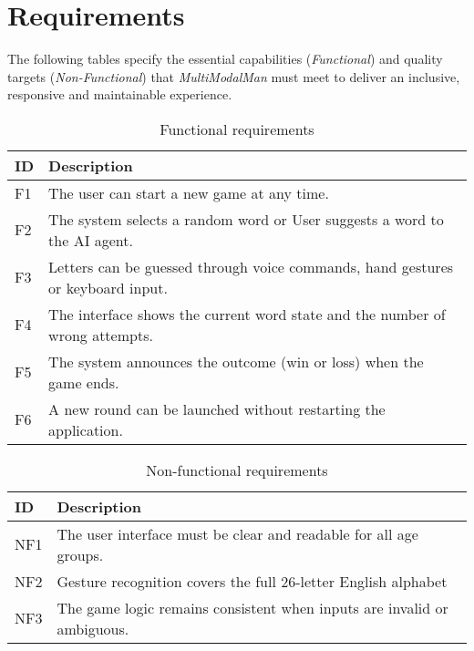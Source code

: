 \section{Requirements}
The following tables specify the essential capabilities (\textit{Functional}) and quality targets (\textit{Non-Functional}) that \textit{MultiModalMan} must meet to deliver an inclusive, responsive and maintainable experience.

\begin{table}[h]
\centering
\caption{Functional requirements}
\begin{tabularx}{\linewidth}{@{}lX@{}}
\toprule
\textbf{ID} & \textbf{Description} \\ \midrule
F1 & The user can start a new game at any time. \\
F2 & The system selects a random word or User suggests a word to the AI agent. \\
F3 & Letters can be guessed through voice commands, hand gestures or keyboard input. \\
F4 & The interface shows the current word state and the number of wrong attempts. \\
F5 & The system announces the outcome (win or loss) when the game ends. \\
F6 & A new round can be launched without restarting the application. \\ \bottomrule
\end{tabularx}
\end{table}

\begin{table}[h]
\centering
\caption{Non-functional requirements}
\begin{tabularx}{\linewidth}{@{}lX@{}}
\toprule
\textbf{ID} & \textbf{Description} \\ \midrule
NF1 & The user interface must be clear and readable for all age groups. \\
NF2 & Gesture recognition covers the full 26-letter English alphabet \\
NF3 & The game logic remains consistent when inputs are invalid or ambiguous. \\ \bottomrule
\end{tabularx}
\end{table}
